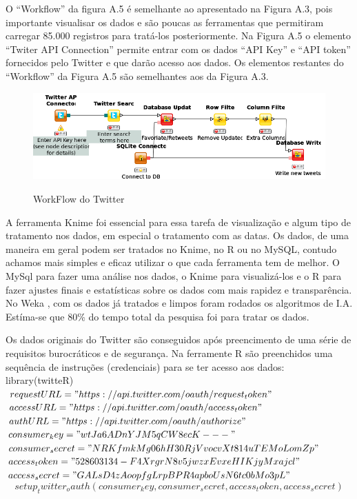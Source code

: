 O ``Workflow'' da figura A.5 é semelhante ao apresentado na Figura A.3, pois importante visualisar os dados e são poucas as ferramentas que permitiram carregar 85.000 registros para tratá-los posteriormente. Na Figura A.5 o elemento ``Twiter API Connection'' permite entrar com os dados ``API Key'' e ``API token'' fornecidos pelo Twitter e que darão acesso aos dados. Os elementos restantes do ``Workflow'' da Figura A.5 são semelhantes aos da Figura A.3.


\begin{figure}[ht!]
\centering
\caption{WorkFlow do Twitter}
\includegraphics[width=0.7\linewidth]{Figuras/Twitter/workflow}
\label{fig:workflow Twitter no Knime}
\end{figure}

A ferramenta Knime \cite{Knime} foi essencial para essa tarefa de visualização e algum tipo de tratamento nos dados, em especial o tratamento com as datas. Os dados, de uma maneira em geral podem ser tratados no Knime, no R ou no MySQL, contudo achamos mais simples e eficaz utilizar o que cada ferramenta tem de melhor. O MySql para fazer uma análise nos dados, o Knime para visualizá-los e o R \cite{R-cran} para fazer ajustes finais e estatísticas sobre os dados com mais rapidez e transparência.
No Weka \cite{Weka}, com os dados já tratados e limpos foram rodados os algoritmos de I.A.
Estíma-se que 80\% do tempo total da pesquisa foi para tratar os dados.

\pagebreak

Os dados originais do Twitter são conseguidos após preencimento de uma série de requisitos burocráticos e de segurança.
Na ferramente R são preenchidos uma sequência de instruções (credenciais) para se ter acesso aos dados:\\

library(twitteR)\\
$ requestURL = "https://api.twitter.com/oauth/request_token" $\\
$ accessURL = "https://api.twitter.com/oauth/access_token" $\\
$ authURL = "https://api.twitter.com/oauth/authorize" $\\
$ consumer_key = "wtJa6ADnYJM5qCW8ecK---" $\\
$ consumer_secret = "NRKfmkMg06hH30RjVvocvXt814uTEMoLomZp" $\\
$ access_token = "528603134-F4XrgrN8v5jwzxEvxeHIKjyMxajcl" $\\
$ access_secret = "GALsD4zAoopfgLrpBPR4apboUsN6tc0bMo3pL" $\\
$$ setup_twitter_oauth(consumer_key, consumer_secret, access_token, access_secret) $$\\

